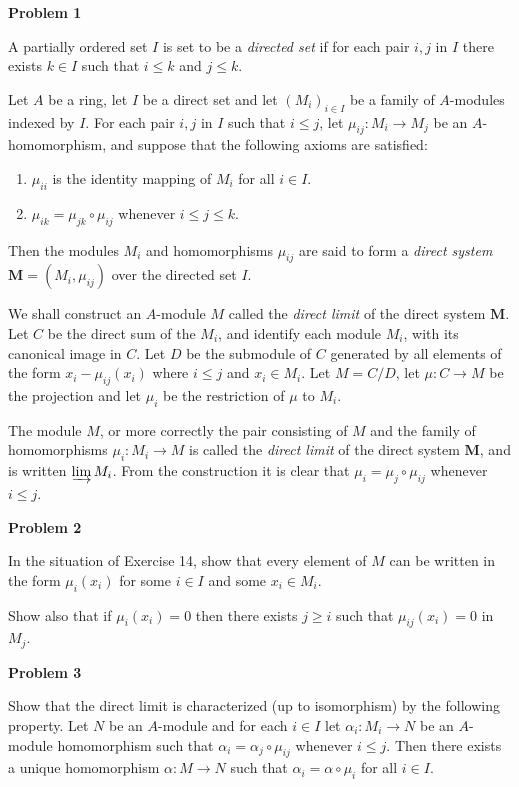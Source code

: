 \textbf{Problem 1}


A partially ordered set $I$ is set to be a \textit{directed set} if for each pair $i, j$ in $I$ there exists $k\in I$ such that $i\leq k$ and $j\leq k$.

Let $A$ be a ring, let $I$ be a direct set and let $(M_i)_{i\in I}$ be a family of $A$-modules indexed by $I$. For each pair $i, j$ in $I$ such that $i\leq j$, let $\mu_{ij}:M_i\to M_j$ be an $A$-homomorphism, and suppose that the following axioms are satisfied:

\begin{enumerate}
    \item $\mu_{ii}$ is the identity mapping of $M_i$ for all $i\in I$.
    \item $\mu_{ik}=\mu_{jk}\circ\mu_{ij}$ whenever $i\leq j\leq k$.
\end{enumerate}

Then the modules $M_i$ and homomorphisms $\mu_{ij}$ are said to form a \textit{direct system} $\mathbf{M}=(M_i,\mu_{ij})$ over the directed set $I$.

We shall construct an $A$-module $M$ called the \textit{direct limit} of the direct system $\mathbf{M}$. Let $C$ be the direct sum of the $M_i$, and identify each module $M_i$, with its canonical image in $C$. Let $D$ be the submodule of $C$ generated by all elements of the form $x_i-\mu_{ij}(x_i)$ where $i\leq j$ and $x_i\in M_i$. Let $M = C/D$, let $\mu:C\to M$ be the projection and let $\mu_i$ be the restriction of $\mu$ to $M_i$.

The module $M$, or more correctly the pair consisting of $M$ and the family of homomorphisms $\mu_i:M_i\to M$ is called the \textit{direct limit} of the direct system $\mathbf{M}$, and is written $\varinjlim M_i$. From the construction it is clear that $\mu_i=\mu_j\circ\mu_{ij}$ whenever $i\leq j$.


\textbf{Problem 2}

In the situation of Exercise 14, show that every element of $M$ can be written in the form $\mu_i(x_i)$ for some $i\in I$ and some $x_i\in M_i$.

Show also that if $\mu_i(x_i)=0$ then there exists $j\geq i$ such that $\mu_{ij}(x_i)=0$ in $M_j$. 

\textbf{Problem 3}


Show that the direct limit is characterized (up to isomorphism) by the following property. Let $N$ be an $A$-module and for each $i\in I$ let $\alpha_i :M_i\to N$ be an $A$-module homomorphism such that $\alpha_i = \alpha_j\circ\mu_{ij}$ whenever $i \leq j$. Then there exists a unique homomorphism $\alpha: M\to N$ such that $\alpha_i=\alpha\circ\mu_i$ for all $i\in I$. 
